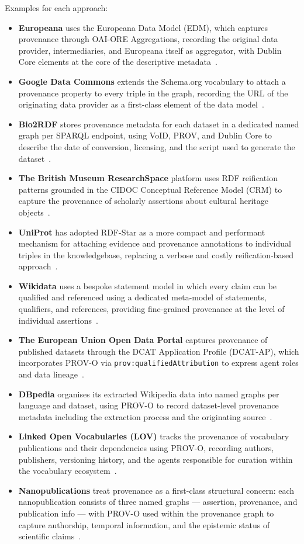 \documentclass[runningheads]{llncs}
\begin{document}
Examples for each approach:

\begin{itemize}
    \item \textbf{Europeana} uses the Europeana Data Model (EDM), which captures provenance through OAI-ORE Aggregations, recording the original data provider, intermediaries, and Europeana itself as aggregator, with Dublin Core elements at the core of the descriptive metadata~\cite{haslhofer2011}.
    \item \textbf{Google Data Commons} extends the Schema.org vocabulary to attach a provenance property to every triple in the graph, recording the URL of the originating data provider as a first-class element of the data model~\cite{datacommons,schemaorg}.
    \item \textbf{Bio2RDF} stores provenance metadata for each dataset in a dedicated named graph per SPARQL endpoint, using VoID, PROV, and Dublin Core to describe the date of conversion, licensing, and the script used to generate the dataset~\cite{callahan2013}.
    \item \textbf{The British Museum ResearchSpace} platform uses RDF reification patterns grounded in the CIDOC Conceptual Reference Model (CRM) to capture the provenance of scholarly assertions about cultural heritage objects~\cite{researchspace}.
    \item \textbf{UniProt} has adopted RDF-Star as a more compact and performant mechanism for attaching evidence and provenance annotations to individual triples in the knowledgebase, replacing a verbose and costly reification-based approach~\cite{rdfstar,uniprot}.
    \item \textbf{Wikidata} uses a bespoke statement model in which every claim can be qualified and referenced using a dedicated meta-model of statements, qualifiers, and references, providing fine-grained provenance at the level of individual assertions~\cite{vrandevcic2014,hernandez2015}.
    \item \textbf{The European Union Open Data Portal} captures provenance of published datasets through the DCAT Application Profile (DCAT-AP), which incorporates PROV-O via \texttt{prov:qualifiedAttribution} to express agent roles and data lineage~\cite{provo,dcatap}.
    \item \textbf{DBpedia} organises its extracted Wikipedia data into named graphs per language and dataset, using PROV-O to record dataset-level provenance metadata including the extraction process and the originating source~\cite{dbpedia}.
    \item \textbf{Linked Open Vocabularies (LOV)} tracks the provenance of vocabulary publications and their dependencies using PROV-O, recording authors, publishers, versioning history, and the agents responsible for curation within the vocabulary ecosystem~\cite{lov}.
    \item \textbf{Nanopublications} treat provenance as a first-class structural concern: each nanopublication consists of three named graphs --- assertion, provenance, and publication info --- with PROV-O used within the provenance graph to capture authorship, temporal information, and the epistemic status of scientific claims~\cite{nanopub}.
\end{itemize}
\end{document}
